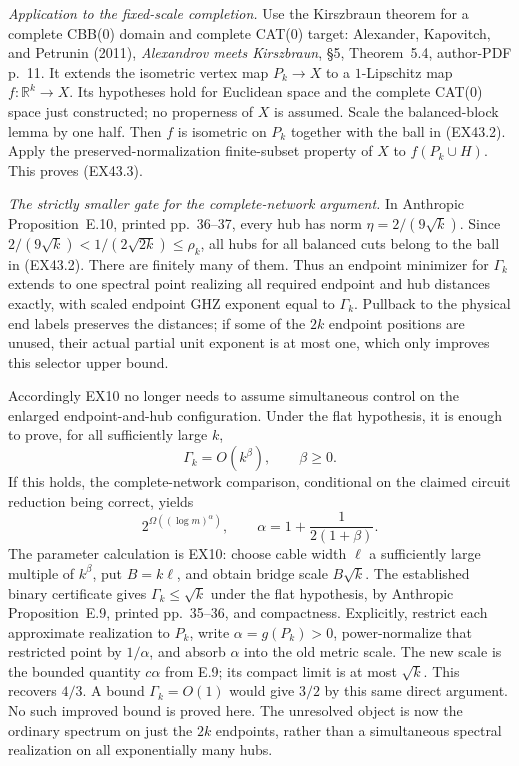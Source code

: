 \emph{Application to the fixed-scale completion.}
Use the Kirszbraun theorem for a complete CBB(0) domain and complete
CAT(0) target: Alexander, Kapovitch, and Petrunin (2011),
\emph{Alexandrov meets Kirszbraun}, \S5, Theorem~5.4, author-PDF p.~11.
It extends the isometric vertex map $P_k\to X$ to a $1$-Lipschitz
map $f:\mathbb R^k\to X$. Its hypotheses hold for Euclidean space
and the complete CAT(0) space just constructed; no properness of
$X$ is assumed. Scale the balanced-block lemma by one half. Then
$f$ is isometric on $P_k$ together with the ball in (EX43.2).
Apply the preserved-normalization finite-subset property of $X$
to $f(P_k\cup H)$. This proves (EX43.3).

\emph{The strictly smaller gate for the complete-network argument.}
In Anthropic Proposition~E.10, printed pp.~36--37, every hub has
norm $\eta=2/(9\sqrt k)$. Since
$2/(9\sqrt k)<1/(2\sqrt{2k})\le\rho_k$, all hubs for all balanced
cuts belong to the ball in (EX43.2). There are finitely many of them.
Thus an endpoint minimizer for $\Gamma_k$ extends to one spectral
point realizing all required endpoint and hub distances exactly,
with scaled endpoint GHZ exponent equal to $\Gamma_k$.
Pullback to the physical end labels preserves the distances; if
some of the $2k$ endpoint positions are unused, their actual partial
unit exponent is at most one, which only improves this selector
upper bound.

Accordingly EX10 no longer needs to assume simultaneous control on
the enlarged endpoint-and-hub configuration. Under the flat hypothesis,
it is enough to prove, for all sufficiently large $k$,
\[
                         \Gamma_k=O(k^\beta),\qquad\beta\ge0.
 \tag{EX43.6}
\]
If this holds, the complete-network comparison, conditional on the
claimed circuit reduction being correct, yields
\[
            2^{\Omega((\log m)^\alpha)},\qquad
            \alpha=1+\frac1{2(1+\beta)}.
 \tag{EX43.7}
\]
The parameter calculation is EX10: choose cable width
$\ell$ a sufficiently large multiple of $k^\beta$, put $B=k\ell$,
and obtain bridge scale $B\sqrt k$.
The established binary certificate gives $\Gamma_k\le\sqrt k$
under the flat hypothesis, by Anthropic Proposition~E.9, printed
pp.~35--36, and compactness. Explicitly, restrict each approximate
realization to $P_k$, write $\alpha=g(P_k)>0$, power-normalize that
restricted point by $1/\alpha$, and absorb $\alpha$ into the old
metric scale. The new scale is the bounded quantity $c\alpha$
from E.9; its compact limit is at most $\sqrt k$. This recovers $4/3$. A bound
$\Gamma_k=O(1)$ would give $3/2$ by this same direct argument.
No such improved bound is proved here. The unresolved object is now
the ordinary spectrum on just the $2k$ endpoints, rather than a
simultaneous spectral realization on all exponentially many hubs.



